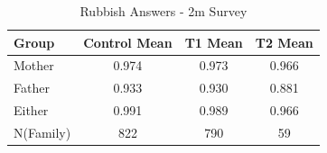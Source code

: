 \begin{table}[htbp]
\centering
\caption{Rubbish Answers - 2m Survey}
\begin{tabular}{lccc}
\toprule
\textbf{Group} & \textbf{Control Mean} & \textbf{T1 Mean} & \textbf{T2 Mean} \\
\midrule
Mother &  0.974 &  0.973 &  0.966 \\
Father &  0.933 &  0.930 &  0.881 \\
Either &  0.991 &  0.989 &  0.966 \\
N(Family) & 822 & 790 & 59 \\
\bottomrule
\end{tabular}
\end{table}
